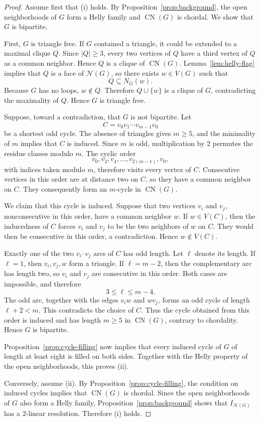 \documentclass[10pt,a4paper]{amsart}
\numberwithin{equation}{section}
\newcommand{\NN}{\mathcal N}
\newcommand{\CN}{\operatorname{CN}}
\begin{document}
	\begin{proof}
		Assume first that \textup{(i)} holds. By
		Proposition~\ref{prop:background}, the open neighborhoods of \(G\) form a
		Helly family and \(\CN(G)\) is chordal. We show that \(G\) is bipartite.
		
		First, \(G\) is triangle free. If \(G\) contained a triangle, it could be
		extended to a maximal clique \(Q\). Since \(|Q|\ge3\), every two vertices
		of \(Q\) have a third vertex of \(Q\) as a common neighbor. Hence \(Q\) is a
		clique of \(\CN(G)\). Lemma~\ref{lem:helly-flag} implies that \(Q\) is a face
		of \(\NN(G)\), so there exists \(w\in V(G)\) such that
		\[
		Q\subseteq N_G(w).
		\]
		Because \(G\) has no loops, \(w\notin Q\). Therefore \(Q\cup\{w\}\) is a
		clique of \(G\), contradicting the maximality of \(Q\). Hence \(G\) is triangle free.
		
		Suppose, toward a contradiction, that \(G\) is not bipartite. Let
		\[
		C=v_0v_1\cdots v_{m-1}v_0
		\]
		be a shortest odd cycle.
		The absence of triangles gives \(m\ge5\), and the minimality of \(m\)
		implies that \(C\) is induced. Since \(m\) is odd, multiplication by \(2\)
		permutes the residue classes modulo \(m\). The cyclic order
		\[
		v_0,v_2,v_4,\ldots,v_{2(m-1)},v_0,
		\]
		with indices taken modulo \(m\), therefore visits every vertex of \(C\).
		Consecutive vertices in this order are at distance two on \(C\), so they
		have a common neighbor on \(C\). They consequently form an \(m\)-cycle in
		\(\CN(G)\).
		
		We claim that this cycle is induced. Suppose that two vertices \(v_i\) and
		\(v_j\), nonconsecutive in this order, have a common neighbor
		\(w\). If \(w\in V(C)\), then the inducedness of \(C\) forces \(v_i\) and
		\(v_j\) to be the two neighbors of \(w\) on \(C\). They would then be
		consecutive in this order, a contradiction. Hence
		\(w\notin V(C)\).
		
		Exactly one of the two \(v_i\)--\(v_j\) arcs of \(C\) has odd length. Let
		\(\ell\) denote its length. If \(\ell=1\), then \(v_i,v_j,w\) form a triangle.
		If \(\ell=m-2\), then the complementary arc has length two, so \(v_i\) and
		\(v_j\) are consecutive in this order. Both cases are impossible,
		and therefore
		\[
		3\le\ell\le m-4.
		\]
		The odd arc, together with the edges \(v_iw\) and \(wv_j\), forms an odd
		cycle of length \(\ell+2<m\). This contradicts the choice of \(C\). Thus the
		cycle obtained from this order is induced and has length \(m\ge5\) in
		\(\CN(G)\),
		contrary to chordality. Hence \(G\) is bipartite.
		
		Proposition~\ref{prop:cycle-filling} now implies that every induced cycle of
		\(G\) of length at least eight is filled on both sides. Together with the
		Helly property of the open neighborhoods, this proves
		\textup{(ii)}.
		
		Conversely, assume \textup{(ii)}. By Proposition~\ref{prop:cycle-filling},
		the condition on induced cycles implies that \(\CN(G)\) is chordal. Since
		the open neighborhoods of \(G\) also form a Helly family,
		Proposition~\ref{prop:background} shows that \(I_{\NN(G)}\) has a \(2\)-linear resolution. Therefore
		\textup{(i)} holds.
	\end{proof}
	
\end{document}

